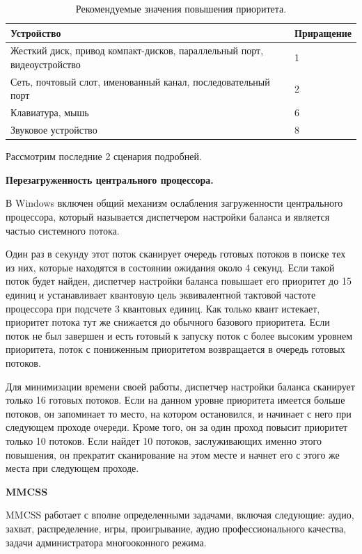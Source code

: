 \documentclass[a4paper, 12pt]{extreport}
\begin{document}
\begin{table}[h!]
	\caption{Рекомендуемые значения повышения приоритета.}
	\begin{center}
		\begin{tabular}{|p{100mm}|l|}
			\hline
			\textbf{Устройство} & \textbf{Приращение} \\
			\hline
			Жесткий диск, привод компакт-дисков, параллельный порт, видеоустройство & 1 \\
			\hline
			Сеть, почтовый слот, именованный канал, последовательный порт & 2 \\
			\hline
			Клавиатура, мышь & 6 \\
			\hline
			Звуковое устройство & 8 \\
			\hline
		\end{tabular}
	\end{center}
	\label{tab:io}
\end{table}

Рассмотрим последние 2 сценария подробней. 

\textbf{Перезагруженность центрального процессора.}

В Windows включен общий механизм ослабления загруженности центрального процессора, который называется диспетчером 
настройки баланса и является частью системного потока.

Один раз в секунду этот поток сканирует очередь готовых потоков в поиске тех из них, которые находятся в состоянии ожидания 
около 4 секунд. Если такой поток будет найден, диспетчер настройки баланса повышает его приоритет до 15 единиц и 
устанавливает квантовую цель эквивалентной тактовой частоте процессора при подсчете 3 квантовых единиц. Как только квант 
истекает, приоритет потока тут же снижается до обычного базового приоритета. Если поток не был завершен и есть готовый к 
запуску поток с более высоким уровнем приоритета, поток с пониженным приоритетом возвращается в очередь готовых 
потоков.

Для минимизации времени своей работы, диспетчер настройки баланса сканирует только 16 готовых потоков. Если на данном 
уровне приоритета имеется больше потоков, он запоминает то место, на котором остановился, и начинает с него при 
следующем проходе очереди. Кроме того, он за один проход повысит приоритет только 10 потоков. Если найдет 10 потоков, 
заслуживающих именно этого повышения, он прекратит сканирование на этом месте и начнет его с этого же места при 
следующем проходе.

\textbf{MMCSS}

MMCSS работает с вполне определенными задачами, включая следующие: аудио, захват, распределение, игры, проигрывание, 
аудио профессионального качества, задачи администратора многооконного режима.
\end{document}
